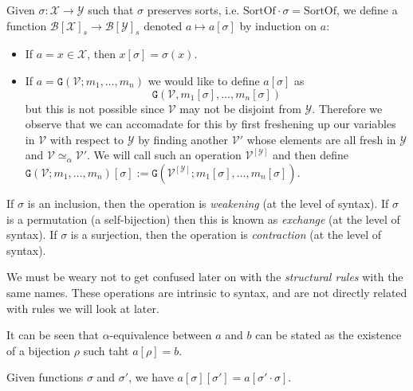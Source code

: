 \begin{defin}\label{sub}
    Given $\sigma : \mathcal{X} \to \mathcal{Y}$ such that $\sigma$ preserves sorts, i.e. $\mathrm{SortOf} \cdot \sigma = \mathrm{SortOf}$, we define a function $\mathcal{B}[\mathcal{X}]_s \to \mathcal{B}[\mathcal{Y}]_s$ denoted $a \mapsto a[\sigma]$ by induction on $a$:
    \begin{itemize}
        \item If $a = x \in \mathcal{X}$, then $x[\sigma] = \sigma(x)$.
        \item If $a = \mathtt{G}(\mathcal{V}; m_1, \dots , m_n)$ we would like to define $a[\sigma]$ as $$\mathtt{G}(\mathcal{V}, m_1[\sigma], \dots, m_n[\sigma])$$ but this is not possible since $\mathcal{V}$ may not be disjoint from $\mathcal{Y}$. Therefore we observe that we can accomadate for this by first freshening up our variables in $\mathcal{V}$ with respect to $\mathcal{Y}$ by finding another $\mathcal{V}'$ whose elements are all fresh in $\mathcal{Y}$ and $\mathcal{V} \simeq_{\alpha}\mathcal{V}'$. We will call such an operation $\mathcal{V}^{[\mathcal{Y}]}$ and then define $\mathtt{G}(\mathcal{V}; m_1 , \dots, m_n)[\sigma] := \mathtt{G}(\mathcal{V}^{[\mathcal{Y}]}; m_1[\sigma], \dots, m_n[\sigma])$. 
    \end{itemize}
    
    If $\sigma$ is an inclusion, then the operation is \emph{weakening} (at the level of syntax).
    If $\sigma$ is a permutation (a self-bijection) then this is known as \emph{exchange} (at the level of syntax).
    If $\sigma$ is a surjection, then the operation is \emph{contraction} (at the level of syntax).
\end{defin}

\begin{remark}
    We must be weary not to get confused later on with the \emph{structural rules} with the same names. These operations are intrinsic to syntax, and are not directly related with rules we will look at later.
\end{remark}

\begin{remark}\label{op_alpha_respect}
    It can be seen that $\alpha$-equivalence between $a$ and $b$ can be stated as the existence of a bijection $\rho$ such taht $a[\rho] = b$.
\end{remark}

\begin{lemma}\label{sub_comp}
    Given functions $\sigma$ and $\sigma'$, we have $a[\sigma][\sigma'] = a[\sigma' \cdot \sigma]$.
\end{lemma}

